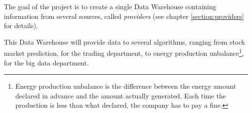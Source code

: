 The goal of the project is to create a single Data Warehouse containing information from several sources, called \textit{providers} (see chapter \ref{section:providers} for details).

This Data Warehouse will provide data to several algorithms, ranging from stock market prediction, for the trading department, to energy production unbalance\footnote{Energy production unbalance is the difference between the energy amount declared in advance and the amount actually generated. Each time the production is less than what declared, the company has to pay a fine.}, for the big data department.

